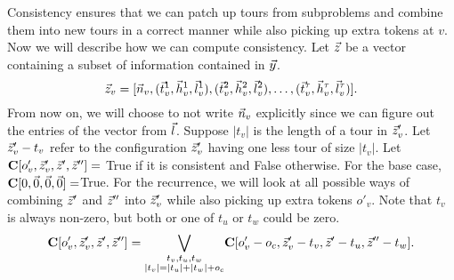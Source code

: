 \documentclass[twoside,leqno]{article}
\begin{document}
Consistency ensures that we can patch up tours from subproblems and combine them into new tours in a correct manner while also picking up extra tokens at $v$. Now we will describe how we can compute consistency. Let $\vec{z}$ be a vector containing a subset of information contained in $\vec{y}$.
$$\vec{z}_v = [\vec{n}_v, (\vec{t}_v^1, \vec{h}_v^1, \vec{l}_v^1), (\vec{t}_v^2, \vec{h}_v^2, \vec{l}_v^2), \ldots, (\vec{t}_v^\tau, \vec{h}_v^\tau, \vec{l}_v^\tau)].$$
From now on, we will choose to not write $\vec{n}_v$ explicitly since we can figure out the entries of the vector from $\vec{l}$. Suppose $|t_v|$ is the length of a tour in $\vec{z}_v'$. Let $\vec{z}_v' - t_v$ refer to the configuration $\vec{z}_v'$ having one less tour of size $|t_v|$.
Let $\textbf{C}[o'_v, \vec{z}_v', \vec{z}', \vec{z}''] = $ True if it is consistent and False otherwise. For the base case, $\textbf{C}[0, \vec{0}, \vec{0}, \vec{0}] = $True. For the recurrence, we will look at all possible ways of combining $\vec{z}'$ and $\vec{z}''$ into $\vec{z}_v'$ while also picking up extra tokens $o'_v$. Note that $t_v$ is always non-zero, but both or one of $t_u$ or $t_w$ could be zero.
$$\textbf{C}[o'_v, \vec{z}_v', \vec{z}', \vec{z}''] = \underset{\substack{t_v, t_u, t_w \\ |t_v| = |t_u| + |t_w| + o_c}}{\bigvee} \textbf{C}[o'_v - o_c, \vec{z}_v' - t_v, \vec{z}' - t_u, \vec{z}'' - t_w].$$

\end{document}
